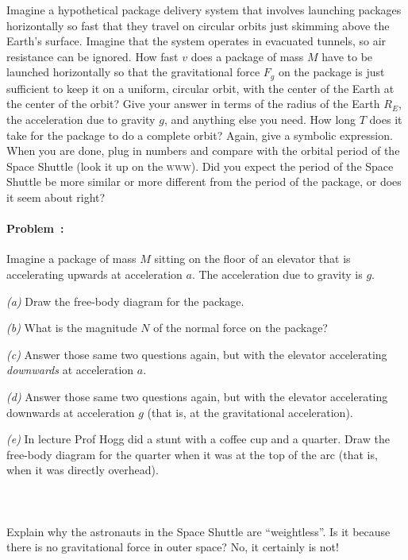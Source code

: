 \documentclass[12pt]{article}
\newcounter{problem}
\begin{document}
Imagine a hypothetical package delivery system that involves launching
packages horizontally so fast that they travel on circular orbits just
skimming above the Earth's surface.  Imagine that the system operates
in evacuated tunnels, so air resistance can be ignored.  How fast $v$
does a package of mass $M$ have to be launched horizontally so that
the gravitational force $F_g$ on the package is just sufficient to
keep it on a uniform, circular orbit, with the center of the Earth at
the center of the orbit?  Give your answer in terms of the radius of
the Earth $R_E$, the acceleration due to gravity $g$, and anything
else you need.  How long $T$ does it take for the package to do a
complete orbit?  Again, give a symbolic expression.  When you are
done, plug in numbers and compare with the orbital period of the Space
Shuttle (look it up on the \textsc{www}).  Did you expect the period
of the Space Shuttle be more similar or more different from the period
of the package, or does it seem about right?

\paragraph{Problem~\theproblem:}%
Imagine a package of mass $M$ sitting on the floor of an elevator that
is accelerating upwards at acceleration $a$. The acceleration due to
gravity is $g$.

\textsl{(a)} Draw the free-body diagram for the package.

\textsl{(b)} What is the magnitude $N$ of the normal force on the
package?

\textsl{(c)} Answer those same two questions again, but with the
elevator accelerating \emph{downwards} at acceleration $a$.

\textsl{(d)} Answer those same two questions again, but with the
elevator accelerating downwards at acceleration $g$ (that is, at
the gravitational acceleration).

\textsl{(e)} In lecture Prof Hogg did a stunt with a coffee cup and a
quarter. Draw the free-body diagram for the quarter when it was at the
top of the arc (that is, when it was directly overhead).

\paragraph{\problemname~\theproblem}

Explain why the astronauts in the Space Shuttle are ``weightless''.
Is it because there is no gravitational force in outer space?  No, it
certainly is not!
\end{document}
